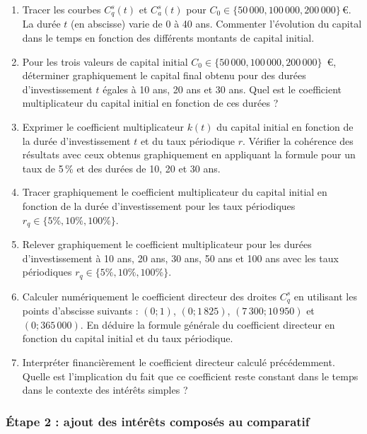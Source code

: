 \documentclass{article}
\begin{document}
\begin{enumerate}[label=\textbf{Q\arabic*.}]
    \item Tracer les courbes \( C^s_q(t) \) et \( C^s_a(t) \) pour \( C_0 \in \{50\,000, 100\,000, 200\,000\} \, \text{€} \). La durée \( t \) (en abscisse) varie de 0 à 40 ans. Commenter l'évolution du capital dans le temps en fonction des différents montants de capital initial.

    \item Pour les trois valeurs de capital initial \( C_0 \in \{50\,000, 100\,000, 200\,000\} \)~€, déterminer graphiquement le capital final obtenu pour des durées d'investissement \( t \) égales à 10 ans, 20 ans et 30 ans. Quel est le coefficient multiplicateur du capital initial en fonction de ces durées ?

    \item Exprimer le coefficient multiplicateur \( k(t) \) du capital initial en fonction de la durée d'investissement \( t \) et du taux périodique \( r \). Vérifier la cohérence des résultats avec ceux obtenus graphiquement en appliquant la formule pour un taux de 5\,\% et des durées de 10, 20 et 30 ans.

    \item Tracer graphiquement le coefficient multiplicateur du capital initial en fonction de la durée d'investissement pour les taux périodiques \( r_q \in \{5\%, 10\%, 100\%\} \).

    \item Relever graphiquement le coefficient multiplicateur pour les durées d'investissement à 10 ans, 20 ans, 30 ans, 50 ans et 100 ans avec les taux périodiques \( r_q \in \{5\%, 10\%, 100\%\} \).

    \item Calculer numériquement le coefficient directeur des droites \( C^s_q \) en utilisant les points d'abscisse suivants : \( (0; 1) \), \( (0; 1\,825) \), \( (7\,300; 10\,950) \) et \( (0; 365\,000) \). En déduire la formule générale du coefficient directeur en fonction du capital initial et du taux périodique.

    \item Interpréter financièrement le coefficient directeur calculé précédemment. Quelle est l'implication du fait que ce coefficient reste constant dans le temps dans le contexte des intérêts simples ?

\end{enumerate}




\subsubsection*{Étape 2 : ajout des intérêts composés au comparatif}
\end{document}
